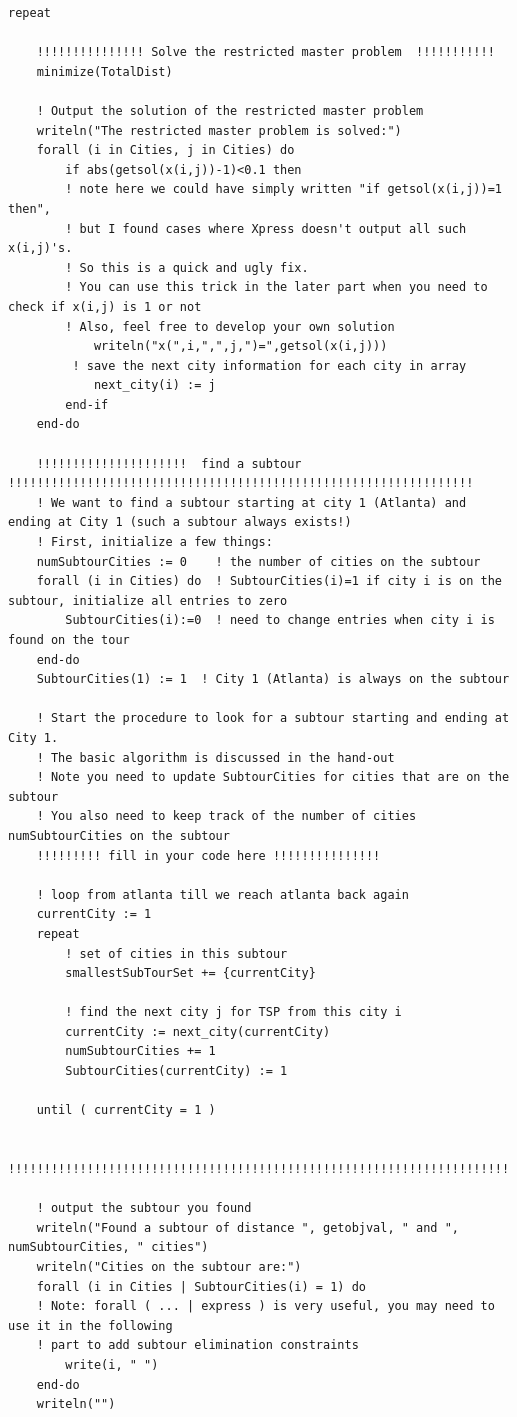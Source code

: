 \documentclass[twoside,12pt]{article}
\begin{document}
\begin{verbatim}
repeat 
	
	!!!!!!!!!!!!!!! Solve the restricted master problem  !!!!!!!!!!!
	minimize(TotalDist)
	
	! Output the solution of the restricted master problem
	writeln("The restricted master problem is solved:")
	forall (i in Cities, j in Cities) do
		if abs(getsol(x(i,j))-1)<0.1 then  
		! note here we could have simply written "if getsol(x(i,j))=1 then", 
		! but I found cases where Xpress doesn't output all such x(i,j)'s. 
		! So this is a quick and ugly fix. 
		! You can use this trick in the later part when you need to check if x(i,j) is 1 or not
		! Also, feel free to develop your own solution
			writeln("x(",i,",",j,")=",getsol(x(i,j)))
		 ! save the next city information for each city in array
			next_city(i) := j
		end-if
	end-do
	
	!!!!!!!!!!!!!!!!!!!!!  find a subtour !!!!!!!!!!!!!!!!!!!!!!!!!!!!!!!!!!!!!!!!!!!!!!!!!!!!!!!!!!!!!!!!!
	! We want to find a subtour starting at city 1 (Atlanta) and ending at City 1 (such a subtour always exists!)
	! First, initialize a few things:
	numSubtourCities := 0    ! the number of cities on the subtour
	forall (i in Cities) do  ! SubtourCities(i)=1 if city i is on the subtour, initialize all entries to zero
		SubtourCities(i):=0  ! need to change entries when city i is found on the tour
	end-do
	SubtourCities(1) := 1  ! City 1 (Atlanta) is always on the subtour
		
	! Start the procedure to look for a subtour starting and ending at City 1. 
	! The basic algorithm is discussed in the hand-out
	! Note you need to update SubtourCities for cities that are on the subtour 
	! You also need to keep track of the number of cities numSubtourCities on the subtour
	!!!!!!!!! fill in your code here !!!!!!!!!!!!!!!
	
	! loop from atlanta till we reach atlanta back again
	currentCity := 1
	repeat
		! set of cities in this subtour
		smallestSubTourSet += {currentCity}
		
		! find the next city j for TSP from this city i
		currentCity := next_city(currentCity)
		numSubtourCities += 1
		SubtourCities(currentCity) := 1
				
	until ( currentCity = 1 )
	
	!!!!!!!!!!!!!!!!!!!!!!!!!!!!!!!!!!!!!!!!!!!!!!!!!!!!!!!!!!!!!!!!!!!!!!!!!!!!!!!!!!!!!!!!!!!!!!!!!!!!!!!!!
	
	! output the subtour you found
	writeln("Found a subtour of distance ", getobjval, " and ", numSubtourCities, " cities")
	writeln("Cities on the subtour are:")
	forall (i in Cities | SubtourCities(i) = 1) do
	! Note: forall ( ... | express ) is very useful, you may need to use it in the following 
	! part to add subtour elimination constraints
		write(i, " ")
	end-do
	writeln("")
	

\end{verbatim}
\end{document}
